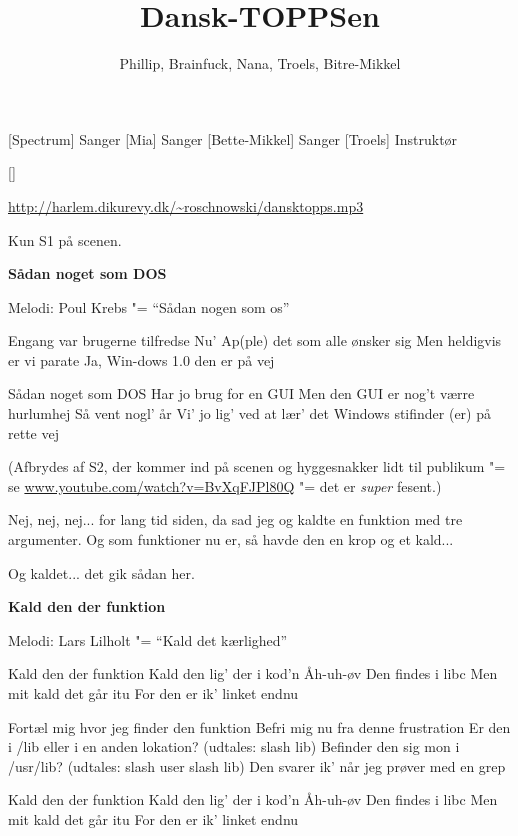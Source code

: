 \documentclass[a4paper,11pt]{article}
\title{Dansk-TOPPSen}
\author{Phillip, Brainfuck, Nana, Troels, Bitre-Mikkel}
\begin{document}
\maketitle

\begin{roles}
[Spectrum] Sanger
[Mia] Sanger
[Bette-Mikkel] Sanger
[Troels] Instruktør
\end{roles}

\begin{props}
[]
\end{props}

\url{http://harlem.dikurevy.dk/~roschnowski/dansktopps.mp3}

Kun S1 på scenen.

\textbf{Sådan noget som DOS}

Melodi: Poul Krebs "= ``Sådan nogen som os''

\begin{song}

 Engang var brugerne tilfredse
Nu' Ap(ple) det som alle ønsker sig
Men heldigvis er vi parate
Ja, Win-dows 1.0 den er på vej

 Sådan noget som DOS
Har jo brug for en GUI
Men den GUI er nog't værre hurlumhej
Så vent nogl' år
Vi' jo lig' ved at lær' det
Windows stifinder (er) på rette vej

\end{song}

(Afbrydes af S2, der kommer ind på scenen og hyggesnakker lidt til
publikum "= se \url{www.youtube.com/watch?v=BvXqFJPl80Q} "= det er
\textit{super} fesent.)

\begin{sketch}
   Nej, nej, nej... for lang tid siden, da sad jeg og kaldte
  en funktion med tre argumenter.  Og som funktioner nu er, så havde
  den en krop og et kald...

   Og kaldet... det gik sådan her.
\end{sketch}

\textbf{Kald den der funktion}

Melodi: Lars Lilholt "= ``Kald det kærlighed''

\begin{song}
 Kald den der funktion
Kald den lig' der i kod'n
Åh-uh-øv
Den findes i libc
Men mit kald det går itu
For den er ik' linket endnu

 Fortæl mig hvor jeg finder den funktion
Befri mig nu fra denne frustration
Er den i /lib eller i en anden lokation? (udtales: slash lib)
Befinder den sig mon i /usr/lib? (udtales: slash user slash lib)
Den svarer ik' når jeg prøver med en grep

 Kald den der funktion
Kald den lig' der i kod'n
Åh-uh-øv
Den findes i libc
Men mit kald det går itu
For den er ik' linket endnu
\end{song}
\end{document}
